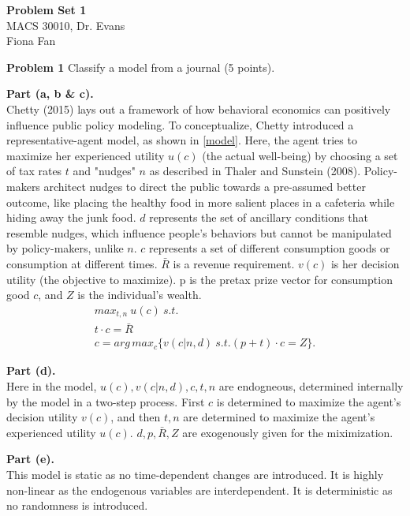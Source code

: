 \documentclass[letterpaper,12pt]{article}
\theoremstyle{definition}
\begin{document}
\begin{flushleft}
  \textbf{\large{Problem Set 1}} \\
  MACS 30010, Dr. Evans \\
  Fiona Fan
\end{flushleft}

\vspace{2mm}

\noindent\textbf{Problem 1}
Classify a model from a journal (5 points).

\textbf{Part (a, b \& c).} \\
Chetty (2015) lays out a framework of how behavioral economics can positively influence public policy modeling. To conceptualize, Chetty introduced a representative-agent model, as shown in \eqref{model}. Here, the agent tries to maximize her experienced utility $u(c)$ (the actual well-being) by choosing a set of tax rates $t$ and "nudges" $n$ as described in Thaler and Sunstein (2008). Policy-makers architect nudges to direct the public towards a pre-assumed better outcome, like placing the healthy food in more salient places in a cafeteria while hiding away the junk food. $d$ represents the set of ancillary conditions that resemble nudges, which influence people's behaviors but cannot be manipulated by policy-makers, unlike $n$. $c$ represents a set of different consumption goods or consumption at different times. $\bar{R}$ is a revenue requirement. $v(c)$ is her decision utility (the objective to maximize). p is the pretax prize vector for consumption good $c$, and $Z$ is the individual's wealth. \\




\begin{align}\label{model}
 max_{t,n} \ u(c) \ s.t.\\
 t \cdot c=\bar{R}\\
 c = arg\,max_{c}\{v(c|n,d) \ s.t.(p+t) \cdot c=Z\}.
\end{align}

\textbf{Part (d).} \\
Here in the model, $u(c), v(c|n,d), c, t, n$ are endogneous, determined internally by the model in a two-step process. First $c$ is determined to  maximize the agent's decision utility $v(c)$, and then $t,n$ are determined to maximize the agent's experienced utility $u(c)$. $d,p,\bar{R}, Z$ are exogenously given for the miximization. 

\textbf{Part (e).} \\
This model is static as no time-dependent changes are introduced. It is highly non-linear as the endogenous variables are interdependent. It is deterministic as no randomness is introduced. 
\end{document}
